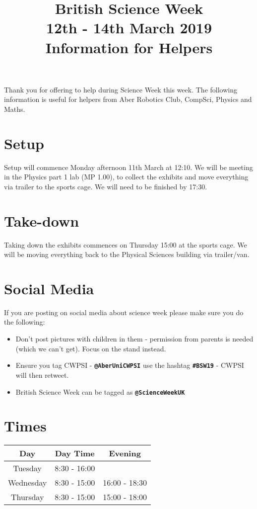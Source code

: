 \documentclass[a4paper]{article}
\title{British Science Week\\12th - 14th March 2019\\Information for Helpers}
\date{}
\begin{document}
\long{}
\maketitle

\noindent
Thank you for offering to help during Science Week this week. The following information is useful for helpers from Aber Robotics Club, CompSci, Physics and Maths.

\section*{Setup}
Setup will commence Monday afternoon 11th March at 12:10. We will be meeting in the Physics part 1 lab (MP 1.00), to collect the exhibits and move everything via trailer to the sports cage. We will need to be finished by 17:30.

\section*{Take-down}
Taking down the exhibits commences on Thursday 15:00 at the sports cage. We will be moving everything back to the Physical Sciences building via trailer/van.

\section*{Social Media}
If you are posting on social media about science week please make sure you do the following:
\begin{itemize}[nolistsep]
	\item Don't post pictures with children in them - permission from parents is needed (which we can't get). Focus on the stand instead.
	\item Ensure you tag CWPSI - \textbf{\texttt{@AberUniCWPSI}} use the hashtag \textbf{\texttt{\#BSW19}} - CWPSI will then retweet.
	\item British Science Week can be tagged as \textbf{\texttt{@ScienceWeekUK}}
\end{itemize}

\section*{Times}
\begin{center}
\begin{tabular}{ |c|c|c| } 
\hline
Day & Day Time & Evening \\
\hline
\hline
Tuesday & 8:30 - 16:00 &  \\ 
\hline
Wednesday & 8:30 - 15:00 & 16:00 - 18:30 \\ 
\hline
Thursday & 8:30 - 15:00 & 15:00 - 18:00 \\ 
\hline
\end{tabular}
\end{center}
\end{document}
